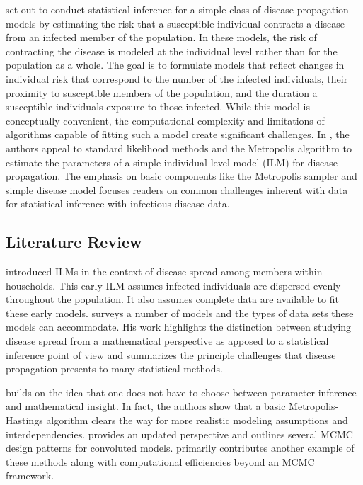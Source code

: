\documentclass{uwstat572}
\begin{document}
\citet{Brown} set out to conduct statistical inference for a simple class of disease propagation models by estimating the risk that a susceptible individual contracts a disease from an infected member of the population. 
In these models, the risk of contracting the disease is modeled at the individual level rather than for the population as a whole. 
The goal is to formulate models that reflect changes in individual risk that correspond to the number of the infected individuals, their proximity to susceptible members of the population, and the duration a susceptible individuals  exposure to those infected. 
While this model is conceptually convenient, the computational complexity and limitations of algorithms capable of fitting such a model create significant challenges.
In \citet{Brown}, the authors appeal to standard likelihood methods and the Metropolis algorithm \citep{Metropolis} to estimate the parameters of a simple individual level model (ILM) for disease propagation.
The emphasis on basic components like the Metropolis sampler and simple disease model focuses readers on common challenges inherent with data for statistical inference with infectious disease data. 

\subsection{Literature Review}
\label{literature_review}
\citet{Haber} introduced ILMs in the context of disease spread among members within households. 
This early ILM assumes infected individuals are dispersed evenly throughout the population. 
It also assumes complete data are available to fit these early models. 
\citet{Becker} surveys a number of models and the types of data sets these models can accommodate. 
His work highlights the distinction between studying disease spread from a mathematical perspective as apposed to a statistical inference point of view and summarizes the principle challenges that disease propagation presents to many statistical methods.

\citet{ONeill} builds on the idea that one does not have to choose between parameter inference and mathematical insight. 
In fact, the authors show that a basic Metropolis-Hastings algorithm clears the way for more realistic modeling assumptions and interdependencies. 
\citet{Jewell} provides an updated perspective and outlines several MCMC design patterns for convoluted models.
\citet{Brown} primarily contributes another example of these methods along with computational efficiencies beyond an MCMC framework. 
\end{document}
